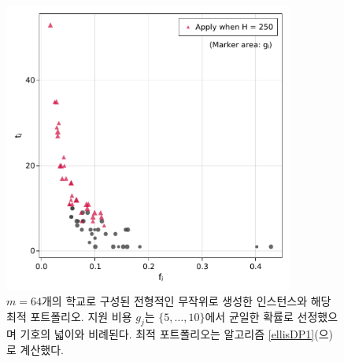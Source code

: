 \documentclass[11pt]{article} %
\newif\ifen
\theoremstyle{definition}
\theoremstyle{definition}
\begin{document}
\begin{figure}[h!] 
\centering
\includegraphics[width=0.85\textwidth]{./plots/samplemarket.pdf}
  \caption{\label{samplemarket}
 \ifen A typical randomly-generated instance with $m=64$ schools and its optimal application portfolio. The application costs $g_j$ were drawn uniformly from $\{5, \dots, 10\}$. The optimal portfolio was computed using Algorithm \ref{ellisDP1}.
 \else $m=64$개의 학교로 구성된 전형적인 무작위로 생성한 인스턴스와 해당 최적 포트폴리오. 지원 비용 $g_j$는 $\{5, \dots, 10\}$에서 균일한 확률로 선정했으며 기호의 넓이와 비례된다. 최적 포트폴리오는 알고리즘 \ref{ellisDP1}(으)로 계산했다. \fi}
\end{figure}
\end{document}
